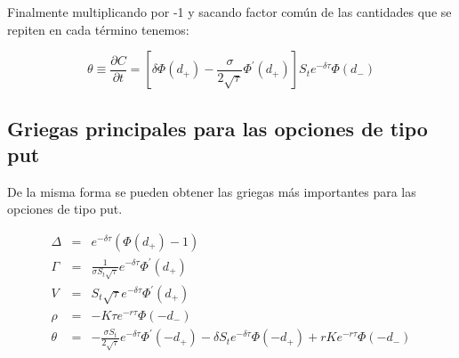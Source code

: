 \documentclass[12pt]{article}
\begin{document}
Finalmente multiplicando por -1 y sacando factor com\'{u}n de las cantidades que se repiten en cada t\'{e}rmino tenemos:

\begin{equation}
	\theta \equiv \frac{\partial C}{\partial t} = \left[\delta\Phi\left(d_{+}\right)-\frac{\sigma}{2\sqrt{\tau}}\Phi^{'}
		\left(d_{+}\right)\right]S_{t}e^{-\delta\tau}\Phi\left(d_{-}\right)
\end{equation}

\subsection{Griegas principales para las opciones de tipo put}
De la misma forma se pueden obtener las griegas m\'{a}s importantes para las opciones de tipo put.

\begin{eqnarray}
	\Delta & = & e^{-\delta\tau}\left(\Phi\left(d_{+}\right)-1\right) \\
	\Gamma & = & \frac{1}{\sigma S_{t}\sqrt{\tau}}e^{-\delta\tau}\Phi^{'}\left(d_{+}\right) \\
	V      & = & S_{t}\sqrt{\tau}e^{-\delta\tau}\Phi^{'}\left(d_{+}\right) \\
	\rho   & = & -K\tau e^{-r\tau}\Phi\left(-d_{-}\right) \\
	\theta & = & -\frac{\sigma S_{t}}{2\sqrt{\tau}}e^{-\delta\tau}\Phi^{'}\left(-d_{+}\right) - \delta S_{t}e^{-\delta\tau}
			\Phi\left(-d_{+}\right) + rKe^{-r\tau}\Phi\left(-d_{-}\right)
\end{eqnarray}
\end{document}
